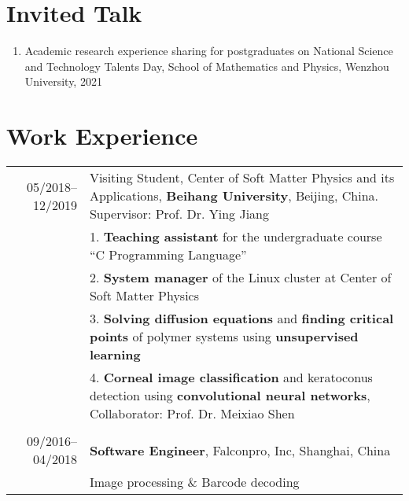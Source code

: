 \documentclass[a4paper,10pt]{article} %
\begin{document}
\section{Invited Talk}  
\begin{small}
	\begin{enumerate}
		\item Academic research experience sharing for postgraduates on National Science and Technology Talents Day, School of Mathematics and Physics, Wenzhou University, 2021
	\end{enumerate}
\end{small}

\section{Work Experience}
\begin{tabular}{r|p{11cm}}
	05/2018--12/2019            & Visiting Student,  Center of Soft Matter Physics and its Applications, \textbf{Beihang University}, Beijing, China. Supervisor: Prof. Dr. Ying Jiang  \\
	& 1. \textbf{Teaching assistant} for the undergraduate course “C Programming Language” \\
	& 2. \textbf{System manager} of the Linux cluster at Center of Soft Matter Physics\\
	& 3. \textbf{Solving diffusion equations} and \textbf{finding critical points} of polymer systems using \textbf{unsupervised learning}\\
	& 4. \textbf{Corneal image classification} and keratoconus detection using \textbf{convolutional neural networks}, Collaborator: Prof. Dr. Meixiao Shen\\
	\multicolumn{2}{c}{} \\	%
	09/2016--04/2018            & \textbf{Software Engineer}, Falconpro, Inc, Shanghai, China \\                          & \footnotesize{Image processing \& Barcode} decoding					
\end{tabular}
\end{document}
